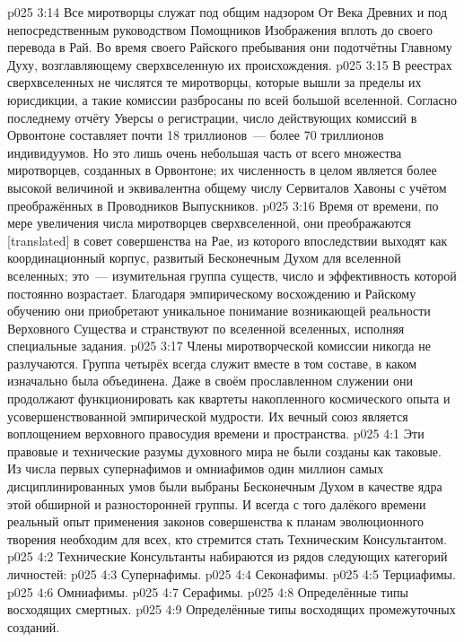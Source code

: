 \vs p025 3:14 \pc Все миротворцы служат под общим надзором От Века Древних и под непосредственным руководством Помощников Изображения вплоть до своего перевода в Рай. Во время своего Райского пребывания они подотчётны Главному Духу, возглавляющему сверхвселенную их происхождения.
\vs p025 3:15 В реестрах сверхвселенных не числятся те миротворцы, которые вышли за пределы их юрисдикции, а такие комиссии разбросаны по всей большой вселенной. Согласно последнему отчёту Уверсы о регистрации, число действующих комиссий в Орвонтоне составляет почти 18 триллионов~--- более 70 триллионов индивидуумов. Но это лишь очень небольшая часть от всего множества миротворцев, созданных в Орвонтоне; их численность в целом является более высокой величиной и эквивалентна общему числу Сервиталов Хавоны с учётом преображённых в Проводников Выпускников.
\vs p025 3:16 Время от времени, по мере увеличения числа миротворцев сверхвселенной, они преображаются [translated] в совет совершенства на Рае, из которого впоследствии выходят как координационный корпус, развитый Бесконечным Духом для вселенной вселенных; это~--- изумительная группа существ, число и эффективность которой постоянно возрастает. Благодаря эмпирическому восхождению и Райскому обучению они приобретают уникальное понимание возникающей реальности Верховного Существа и странствуют по вселенной вселенных, исполняя специальные задания.
\vs p025 3:17 Члены миротворческой комиссии никогда не разлучаются. Группа четырёх всегда служит вместе в том составе, в каком изначально была объединена. Даже в своём прославленном служении они продолжают функционировать как квартеты накопленного космического опыта и усовершенствованной эмпирической мудрости. Их вечный союз является воплощением верховного правосудия времени и пространства.
\vs p025 4:1 Эти правовые и технические разумы духовного мира не были созданы как таковые. Из числа первых супернафимов и омниафимов один миллион самых дисциплинированных умов были выбраны Бесконечным Духом в качестве ядра этой обширной и разносторонней группы. И всегда с того далёкого времени реальный опыт применения законов совершенства к планам эволюционного творения необходим для всех, кто стремится стать Техническим Консультантом.
\vs p025 4:2 \pc Технические Консультанты набираются из рядов следующих категорий личностей:
\vs p025 4:3 Супернафимы.
\vs p025 4:4 Секонафимы.
\vs p025 4:5 Терциафимы.
\vs p025 4:6 Омниафимы.
\vs p025 4:7 Серафимы.
\vs p025 4:8 Определённые типы восходящих смертных.
\vs p025 4:9 Определённые типы восходящих промежуточных созданий.
